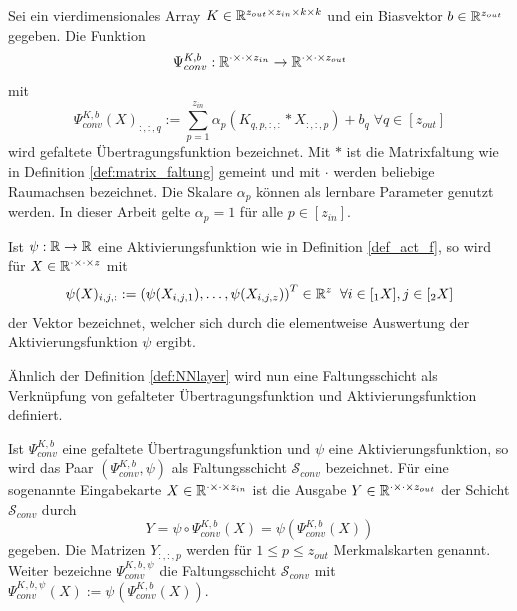 \begin{defi}
    \label{eq:convlogit}
    Sei ein vierdimensionales Array $K \in \mathbb{R}^{z_{out} \times z_{in} \times k \times k}$ und ein Biasvektor $b \in \mathbb{R}^{z_{out}}$ gegeben. Die Funktion 
    \begin{equation*}
        \Psi_{conv}^{K,b}: \mathbb{R}^{\cdot \times \cdot \times z_{in}} \rightarrow \mathbb{R}^{\cdot \times \cdot\times z_{out}}
    \end{equation*}
    mit
    \begin{equation*}
        \Psi_{conv}^{K,b}(X)_{:,:,q}:= \sum_{p=1}^{z_{in}} \alpha_p\left(K_{q,p,:,:} \ast X_{:,:,p} \right) +b_q \; \forall q \in [z_{out}]
    \end{equation*}
    wird gefaltete Übertragungsfunktion bezeichnet. Mit $\ast$ ist die Matrixfaltung wie in Definition \ref{def:matrix_faltung} gemeint und mit $\cdot$ werden beliebige Raumachsen bezeichnet. Die Skalare $\alpha_p$ können als lernbare Parameter genutzt werden. In dieser Arbeit gelte $\alpha_p=1$ für alle $p \in [z_{in}]$.
\end{defi}


\begin{bem}
    Ist $\psi: \mathbb{R} \rightarrow \mathbb{R}$ eine Aktivierungsfunktion wie in Definition \ref{def_act_f}, so wird für $X \in \mathbb{R}^{\cdot \times \cdot \times z}$ mit 
    \[\psi(X)_{i,j,:}:=\left(\psi(X_{i,j,1}), \ldots, \psi(X_{i,j,z})\right)^T \in \mathbb{R}^z \; \; \forall i \in [{}_1 X], j \in [{}_2 X] 
    \]
    der Vektor bezeichnet, welcher sich durch die elementweise Auswertung der Aktivierungsfunktion $\psi$ ergibt.
\end{bem}

Ähnlich der Definition \ref{def:NNlayer} wird nun eine Faltungsschicht als Verknüpfung von gefalteter Übertragungsfunktion und Aktivierungsfunktion definiert.

\begin{defi}[Faltungsschicht]
    \label{def:convlayer}
    Ist $\Psi_{conv}^{K,b}$ eine gefaltete Übertragungsfunktion und $\psi$ eine Aktivierungsfunktion, so wird das Paar $(\Psi_{conv}^{K,b}, \psi)$ als Faltungsschicht $\mathcal{S}_{conv}$ bezeichnet. Für eine sogenannte Eingabekarte $X \in \mathbb{R}^{\cdot \times \cdot \times z_{in}}$ ist die Ausgabe $Y \in \mathbb{R}^{\cdot \times \cdot \times z_{out}}$ der Schicht $\mathcal{S}_{conv}$ durch
    \[Y=\psi \circ \Psi_{conv}^{K,b}(X)= \psi\left(\Psi_{conv}^{K,b}(X)\right)
        \] 
        gegeben. Die Matrizen $Y_{:,:,p}$ werden für $1 \leq p \leq z_{out}$ Merkmalskarten genannt. Weiter bezeichne $\Psi_{conv}^{K^{},b^{},\psi_{}}$ die Faltungsschicht $\mathcal{S}_{conv}$ mit $\Psi_{conv}^{K^{},b^{},\psi_{}}(X):= \psi_{} \left(\Psi_{conv}^{K^{},b^{}}(X)\right)$.
\end{defi}

